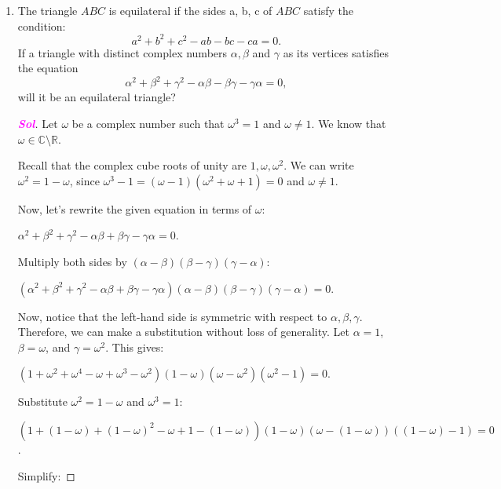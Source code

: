\documentclass{article}
\theoremstyle{definition}
\newcommand{\sol}{\textcolor{magenta}{\bf Sol}}
\begin{document}
\begin{enumerate}
\begin{proof}[\sol]
\begin{enumerate}
				$\frac{\partial u}{\partial x}(0, 0) = 0 = \frac{\partial v}{\partial y}(0, 0)$
				$\frac{\partial u}{\partial y}(0, 0) = 0 = -\frac{\partial v}{\partial x}(0, 0)$
				As the Cauchy-Riemann equations hold at $z = 0$, we can conclude that the function $f(z)$ is complex differentiable at $z = 0$.
			\end{enumerate}
		\end{proof}
		
		\item The triangle $ABC$ is equilateral if the sides a, b, c of $ABC$ satisfy the condition: \[
		a^2 + b^2 + c^2 - ab - bc - ca = 0.
		\]
		If a triangle with distinct complex numbers $\alpha,\beta$ and $\gamma$ as its vertices satisfies the equation \[
		\alpha^2+\beta^2+\gamma^2-\alpha\beta-\beta\gamma-\gamma\alpha=0,
		\] will it be an equilateral triangle?
		\begin{proof}[\sol]
			Let $\omega$ be a complex number such that $\omega^3 = 1$ and $\omega \neq 1$. We know that $\omega \in \mathbb{C} \setminus \mathbb{R}$.
			
			Recall that the complex cube roots of unity are $1, \omega, \omega^2$. We can write $\omega^2 = 1 - \omega$, since $\omega^3 - 1 = (\omega - 1)(\omega^2 + \omega + 1) = 0$ and $\omega \neq 1$.
			
			Now, let's rewrite the given equation in terms of $\omega$:
			
			$\alpha^2 + \beta^2 + \gamma^2 - \alpha\beta + \beta\gamma - \gamma\alpha = 0$.
			
			Multiply both sides by $(\alpha - \beta)(\beta - \gamma)(\gamma - \alpha)$:
			
			$(\alpha^2 + \beta^2 + \gamma^2 - \alpha\beta + \beta\gamma - \gamma\alpha)(\alpha - \beta)(\beta - \gamma)(\gamma - \alpha) = 0$.
			
			Now, notice that the left-hand side is symmetric with respect to $\alpha, \beta, \gamma$. Therefore, we can make a substitution without loss of generality. Let $\alpha = 1$, $\beta = \omega$, and $\gamma = \omega^2$. This gives:
			
			$(1 + \omega^2 + \omega^4 - \omega + \omega^3 - \omega^2)(1 - \omega)(\omega - \omega^2)(\omega^2 - 1) = 0$.
			
			Substitute $\omega^2 = 1 - \omega$ and $\omega^3 = 1$:
			
			$(1 + (1 - \omega) + (1 - \omega)^2 - \omega + 1 - (1 - \omega))(1 - \omega)(\omega - (1 - \omega))((1 - \omega) - 1) = 0$.
			
			Simplify:
			

\end{proof}
\end{enumerate}
\end{document}
